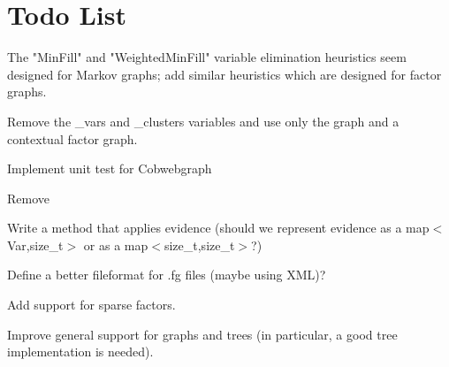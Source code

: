 \chapter{Todo List}
\hypertarget{todo}{}\label{todo}

\begin{DoxyRefList}
\item[File \doxylink{clustergraph_8h}{clustergraph.h} ]\label{todo__todo000001}%
%
The "{}\+Min\+Fill"{} and "{}\+Weighted\+Min\+Fill"{} variable elimination heuristics seem designed for Markov graphs; add similar heuristics which are designed for factor graphs.  
\item[Class \doxylink{classdai_1_1ClusterGraph}{dai\+::Cluster\+Graph} ]\label{todo__todo000002}%
%
Remove the \+\_\+vars and \+\_\+clusters variables and use only the graph and a contextual factor graph.  
\item[Class \doxylink{classdai_1_1CobwebGraph}{dai\+::Cobweb\+Graph} ]\label{todo__todo000003}%
%
Implement unit test for Cobwebgraph  
\item[Member \doxylink{structdai_1_1CobwebGraph_1_1Connection_a9072dfec3d0281668d29a5b3efdd8d6f}{dai\+::Cobweb\+Graph\+::Connection\+::newmsg} ]\label{todo__todo000004}%
%
Remove   
\item[Class \doxylink{classdai_1_1FactorGraph}{dai\+::Factor\+Graph} ]\label{todo__todo000006}%
%
Write a method that applies evidence (should we represent evidence as a map$<$\+Var,size\+\_\+t$>$ or as a map$<$size\+\_\+t,size\+\_\+t$>$?)  
\item[Class \doxylink{classdai_1_1TFactor}{dai\+::TFactor\texorpdfstring{$<$}{<} T \texorpdfstring{$>$}{>}} ]\label{todo__todo000005}%
%
Define a better fileformat for .fg files (maybe using XML)? 



Add support for sparse factors.  
\item[File \doxylink{weightedgraph_8h}{weightedgraph.h} ]\label{todo__todo000007}%
%
Improve general support for graphs and trees (in particular, a good tree implementation is needed). 
\end{DoxyRefList}